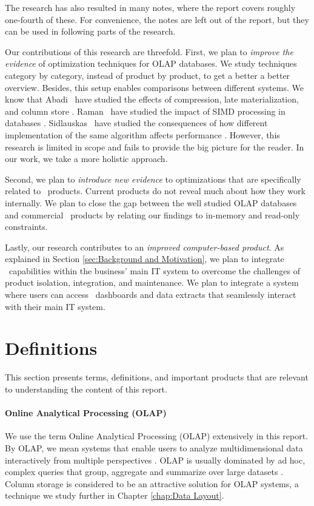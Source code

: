 {The research has also resulted in many notes, where the report covers roughly one-fourth of these. For convenience, the notes are left out of the report, but they can be used in following parts of the research.

Our contributions of this research are threefold. First, we plan to \textit{improve the evidence} of optimization techniques for OLAP databases. We study techniques category by category, instead of product by product, to get a better a better overview. Besides, this setup enables comparisons between different systems. We know that Abadi \ea~have studied the effects of compression, late materialization, and column store \cite{Abadi2008-dd}. Raman \ea~have studied the impact of SIMD processing in databases \cite{Raman2008-gi}. Sidlauskas \ea~have studied the consequences of how different implementation of the same algorithm affects performance \cite{Sidlauskas2014-ef}. However, this research is limited in scope and fails to provide the big picture for the reader. In our work, we take a more holistic approach.

Second, we plan to \textit{introduce new evidence} to optimizations that are specifically related to \bd~products. Current products do not reveal much about how they work internally. We plan to close the gap between the well studied OLAP databases and commercial \bd~products by relating our findings to in-memory and read-only constraints.

Lastly, our research contributes to an \textit{improved computer-based product}. As explained in Section \ref{sec:Background and Motivation}, we plan to integrate \bd~capabilities within the business' main IT system to overcome the challenges of product isolation, integration, and maintenance. We plan to integrate a system where users can access \bd~dashboards and data extracts that seamlessly interact with their main IT system.

\section{Definitions}
\label{sec:Definitions}

This section presents terms, definitions, and important products that are relevant to understanding the content of this report.

\paragraph{Online Analytical Processing (OLAP)}
\label{par:Online Analytical Processing (OLAP)}
  We use the term Online Analytical Processing (OLAP) extensively in this report. By OLAP, we mean systems that enable users to analyze multidimensional data interactively from multiple perspectives \cite{Wikipedia_contributors2015-hw}. OLAP is usually dominated by ad hoc, complex queries that group, aggregate and summarize over large datasets \cite{Bjorklund2011-wh}. Column storage is considered to be an attractive solution for OLAP systems, a technique we study further in Chapter \ref{chap:Data Layout}. 


}
